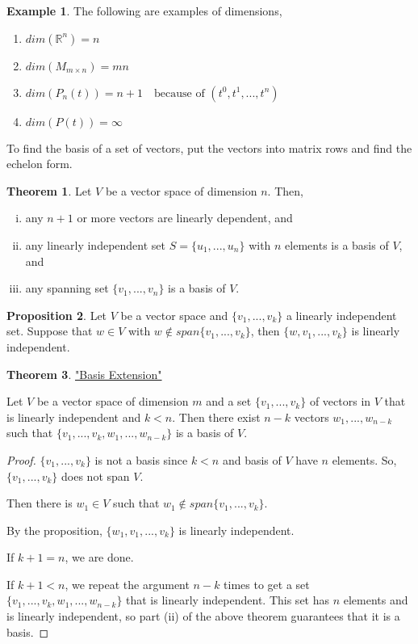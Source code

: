 \documentclass{report}
\theoremstyle{definition}
\newtheorem{_thm}{Theorem}[section]
\newtheorem{_prop}[_thm]{Proposition}
\newtheorem{ex}{Example}[section]
\theoremstyle{remark}
\begin{document}
\begin{ex} The following are examples of dimensions,

\begin{enumerate}[1)]
 \item $dim(\mathbb{R}^n)=n$
 \item $dim(M_{m\times n})=mn$
 \item $dim(P_n(t))=n+1 \quad \text{because of }(t^0,t^1,...,t^n)$
 \item $dim(P(t))=\infty$
\end{enumerate}
\end{ex}

To find the basis of a set of vectors, put the vectors into matrix rows and find the echelon form.

\begin{_thm}
Let $V$ be a vector space of dimension $n$.
Then,
\begin{enumerate}[i)]
 \item any $n+1$ or more vectors are linearly dependent, and
 \item any linearly independent set $S=\{u_1,...,u_n\}$ with $n$ elements is a basis of $V$, and
 \item any spanning set $\{v_1,...,v_n\}$ is a basis of $V$.
\end{enumerate}
\end{_thm}

\begin{_prop}
Let $V$ be a vector space and $\{v_1,...,v_k\}$ a linearly independent set.
Suppose that $w\in V$ with $w\notin span\{v_1,...,v_k\}$, then $\{w,v_1,...,v_k\}$ is linearly independent.
\end{_prop}

\begin{_thm}
\underline{"Basis Extension"}

Let $V$ be a vector space of dimension $m$ and a set $\{v_1,...,v_k\}$ of vectors in $V$ that is linearly independent and $k<n$.
Then there exist $n-k$ vectors $w_1,...,w_{n-k}$ such that $\{v_1,...,v_k,w_1,...,w_{n-k}\}$ is a basis of $V$.
\end{_thm}

\begin{proof}
$\{v_1,...,v_k\}$ is not a basis since $k<n$ and basis of $V$ have $n$ elements.
So, $\{v_1,...,v_k\}$ does not span $V$.

Then there is $w_1\in V$ such that $w_1\notin span\{v_1,...,v_k\}$.

By the proposition, $\{w_1,v_1,...,v_k\}$ is linearly independent.

If $k+1=n$, we are done.

If $k+1<n$, we repeat the argument $n-k$ times to get a set $\{v_1,...,v_k,w_1,...,w_{n-k}\}$ that is linearly independent.
This set has $n$ elements and is linearly independent, so part (ii) of the above theorem guarantees that it is a basis.
\end{proof}
\end{document}
